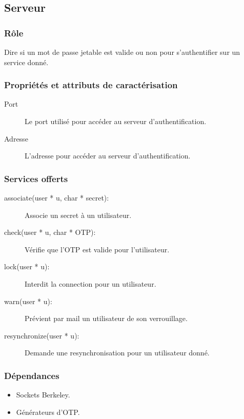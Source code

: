 \documentclass{"../../res/univ-projet"}
\begin{document}
\subsection{Serveur}
    \subsubsection{Rôle}
    Dire si un mot de passe jetable est valide ou non pour s'authentifier sur un
    service donné.

    \subsubsection{Propriétés et attributs de caractérisation}
    \begin{description}
        \item[Port] Le port utilisé pour accéder au serveur
            d'authentification.
        \item[Adresse] L'adresse pour accéder au serveur 
            d'authentification.
    \end{description}

    \subsubsection{Services offerts}
    \begin{description}
        \item[associate(user * u, char * secret):] Associe un secret à un 
            utilisateur.
        \item[check(user * u, char * OTP):] Vérifie que l'OTP est valide pour
            l'utilisateur.
        \item[lock(user * u):] Interdit la connection pour un utilisateur.
        \item[warn(user * u):] Prévient par mail un utilisateur de son 
            verrouillage.
        \item[resynchronize(user * u):] Demande une resynchronisation pour
            un utilisateur donné.
    \end{description}

    \subsubsection{Dépendances}
    \begin{itemize}
        \item Sockets Berkeley.
        \item Générateurs d'OTP.
    \end{itemize}
\end{document}
